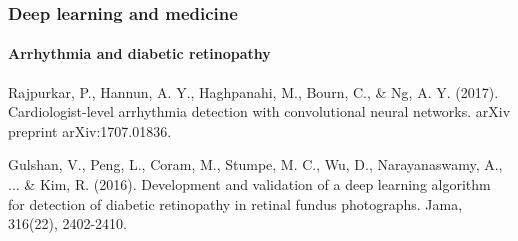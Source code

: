 \documentclass[9pt]{beamer}
\begin{document}
\begin{frame}

  \frametitle{Deep learning and medicine}

  \framesubtitle{Arrhythmia and diabetic retinopathy}

  \begin{center}
  \end{center}

  {\scriptsize Rajpurkar, P., Hannun, A. Y., Haghpanahi, M., Bourn,
    C., \& Ng, A. Y. (2017). Cardiologist-level arrhythmia detection
    with convolutional neural networks. arXiv preprint
    arXiv:1707.01836.}

  \begin{center}
  \end{center}

  {\scriptsize Gulshan, V., Peng, L., Coram, M., Stumpe, M. C., Wu, D.,
    Narayanaswamy, A., ... \& Kim, R. (2016). Development and
    validation of a deep learning algorithm for detection of diabetic
    retinopathy in retinal fundus photographs. Jama, 316(22),
    2402-2410.}
\end{frame}
\end{document}
